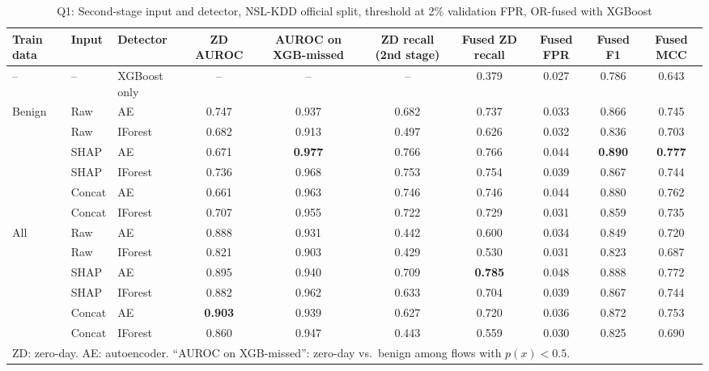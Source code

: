 \documentclass[conference]{IEEEtran}
\begin{document}
\begin{table}[t]
\caption{Q1: Second-stage input and detector, NSL-KDD official split, threshold at 2\% validation FPR, OR-fused with XGBoost}
\label{tab:q1}
\centering
\begin{tabular}{lllccccccc}
\toprule
Train data & Input & Detector & ZD AUROC & AUROC on XGB-missed & ZD recall (2nd stage) & Fused ZD recall & Fused FPR & Fused F1 & Fused MCC \\
\midrule
-- & -- & XGBoost only & -- & -- & -- & 0.379 & 0.027 & 0.786 & 0.643 \\
\midrule
\multirow{6}{*}{Benign} & Raw & AE & 0.747 & 0.937 & 0.682 & 0.737 & 0.033 & 0.866 & 0.745 \\
 & Raw & IForest & 0.682 & 0.913 & 0.497 & 0.626 & 0.032 & 0.836 & 0.703 \\
 & SHAP & AE & 0.671 & \textbf{0.977} & 0.766 & 0.766 & 0.044 & \textbf{0.890} & \textbf{0.777} \\
 & SHAP & IForest & 0.736 & 0.968 & 0.753 & 0.754 & 0.039 & 0.867 & 0.744 \\
 & Concat & AE & 0.661 & 0.963 & 0.746 & 0.746 & 0.044 & 0.880 & 0.762 \\
 & Concat & IForest & 0.707 & 0.955 & 0.722 & 0.729 & 0.031 & 0.859 & 0.735 \\
\midrule
\multirow{6}{*}{All} & Raw & AE & 0.888 & 0.931 & 0.442 & 0.600 & 0.034 & 0.849 & 0.720 \\
 & Raw & IForest & 0.821 & 0.903 & 0.429 & 0.530 & 0.031 & 0.823 & 0.687 \\
 & SHAP & AE & 0.895 & 0.940 & 0.709 & \textbf{0.785} & 0.048 & 0.888 & 0.772 \\
 & SHAP & IForest & 0.882 & 0.962 & 0.633 & 0.704 & 0.039 & 0.867 & 0.744 \\
 & Concat & AE & \textbf{0.903} & 0.939 & 0.627 & 0.720 & 0.036 & 0.872 & 0.753 \\
 & Concat & IForest & 0.860 & 0.947 & 0.443 & 0.559 & 0.030 & 0.825 & 0.690 \\
\bottomrule
\multicolumn{10}{l}{\footnotesize ZD: zero-day. AE: autoencoder. ``AUROC on XGB-missed'': zero-day vs.\ benign among flows with $p(x)<0.5$.}
\end{tabular}
\end{table}
\end{document}
